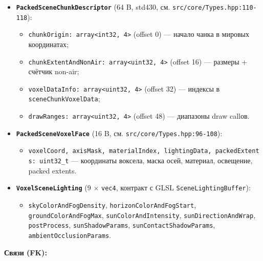 \begin{itemize}
\tightlist
\item
  \textbf{\texttt{PackedSceneChunkDescriptor}} (64 B, std430, см. \texttt{src/core/Types.hpp:110-118}):

  \begin{itemize}
  \tightlist
  \item
    \texttt{chunkOrigin:\ array\textless{}int32,\ 4\textgreater{}} (offset 0) --- начало чанка в мировых координатах;
  \item
    \texttt{chunkExtentAndNonAir:\ array\textless{}uint32,\ 4\textgreater{}} (offset 16) --- размеры + счётчик non-air;
  \item
    \texttt{voxelDataInfo:\ array\textless{}uint32,\ 4\textgreater{}} (offset 32) --- индексы в \texttt{sceneChunkVoxelData};
  \item
    \texttt{drawRanges:\ array\textless{}uint32,\ 4\textgreater{}} (offset 48) --- диапазоны draw call\textquotesingle ов.
  \end{itemize}
\item
  \textbf{\texttt{PackedSceneVoxelFace}} (16 B, см. \texttt{src/core/Types.hpp:96-108}):

  \begin{itemize}
  \tightlist
  \item
    \texttt{voxelCoord,\ axisMask,\ materialIndex,\ lightingData,\ packedExtents:\ uint32\_t} --- координаты воксела, маска осей, материал, освещение, packed extents.
  \end{itemize}
\item
  \textbf{\texttt{VoxelSceneLighting}} (9 × \texttt{vec4}, контракт с GLSL \texttt{SceneLightingBuffer}):

  \begin{itemize}
  \tightlist
  \item
    \texttt{skyColorAndFogDensity}, \texttt{horizonColorAndFogStart}, \texttt{groundColorAndFogMax}, \texttt{sunColorAndIntensity}, \texttt{sunDirectionAndWrap}, \texttt{postProcess}, \texttt{sunShadowParams}, \texttt{sunContactShadowParams}, \texttt{ambientOcclusionParams}.
  \end{itemize}
\end{itemize}

\textbf{Связи (FK):}

